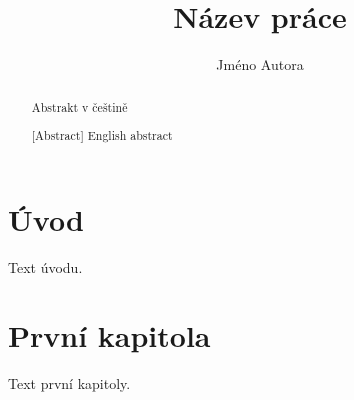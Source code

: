 \documentclass[oneside,a4paper,12pt]{book}
\author{Jméno Autora}
\title{Název práce}
\begin{document}
\TitlePage
{}

\begin{abstract}
Abstrakt v češtině
\SavedKeywords %
\end{abstract}

\begin{abstract}[Abstract]
English abstract
\end{abstract}

\tableofcontents
\chapter{Úvod}
Text úvodu.

\chapter{První kapitola}
Text první kapitoly.
\end{document}
